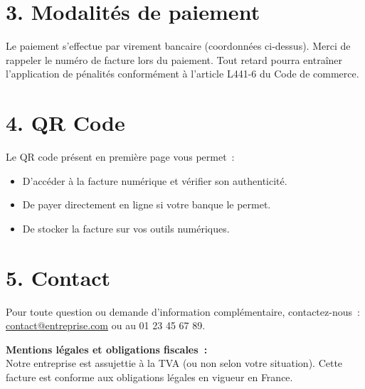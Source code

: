 \documentclass[12pt,a4paper]{article}
\begin{document}
\section*{3. Modalités de paiement}
Le paiement s’effectue par virement bancaire (coordonnées ci-dessus). Merci de rappeler le numéro de facture lors du paiement. Tout retard pourra entraîner l’application de pénalités conformément à l’article L441-6 du Code de commerce.

\section*{4. QR Code}
Le QR code présent en première page vous permet :
\begin{itemize}
    \item D’accéder à la facture numérique et vérifier son authenticité.
    \item De payer directement en ligne si votre banque le permet.
    \item De stocker la facture sur vos outils numériques.
\end{itemize}

\section*{5. Contact}
Pour toute question ou demande d’information complémentaire, contactez-nous : \href{mailto:contact@entreprise.com}{contact@entreprise.com} ou au 01 23 45 67 89.

\vspace{1cm}

\noindent
\textbf{Mentions légales et obligations fiscales :}\\
Notre entreprise est assujettie à la TVA (ou non selon votre situation). Cette facture est conforme aux obligations légales en vigueur en France. 
\end{document}
